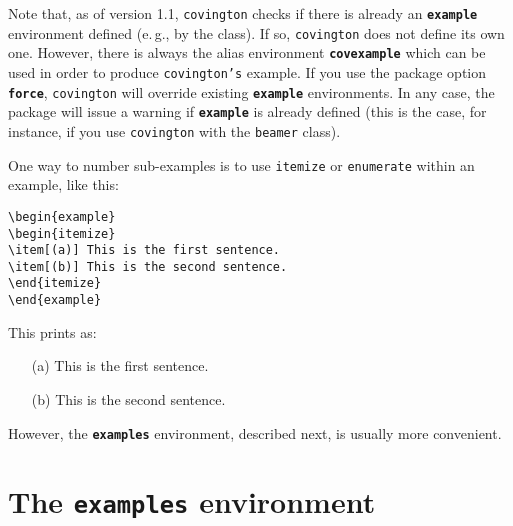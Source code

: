 \documentclass[english]{article}
\newcommand*\jenv[1]{\textbf{\texttt{#1}}}
\newcommand*\joption[1]{\textbf{\texttt{#1}}}
\newcommand*\jfenv[1]{\texttt{#1}}
\begin{document}
Note that, as of version 1.1, \texttt{covington} checks if there is already an \jenv{example} environment defined (e.\,g., by the class). If so, \texttt{covington} does not
define its own one. However, there is always the alias environment \jenv{covexample} which can be used in order to produce \texttt{covington's} example. If you use the package option \joption{force}, \texttt{covington} will override existing \jenv{example} environments. In any case, the package will issue a warning if \jenv{example} is already defined (this is the case, for instance, if you use \texttt{covington} with the \texttt{beamer} class).

One way to number sub-examples is to use \jfenv{itemize} or \jfenv{enumerate}
within an example, like this:
\begin{lstlisting}
\begin{example}
\begin{itemize}
\item[(a)] This is the first sentence.
\item[(b)] This is the second sentence.
\end{itemize}
\end{example}
\end{lstlisting}
This prints as:
\begin{example}
\begin{itemize}
\item[(a)] This is the first sentence.
\item[(b)] This is the second sentence.
\end{itemize}
\end{example}
However, the \jenv{examples} environment, described next, is usually more 
convenient.

\section{The \jenv{examples} environment}\label{sec:exs}
\end{document}
